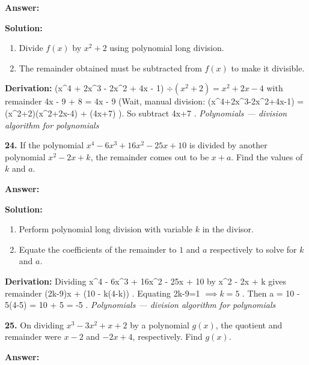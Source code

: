 \documentclass[12pt,a4paper]{exam}
\newcommand{\fitmath}[1]{%
  \sbox{\schmathbox}{$\displaystyle #1$}%
  \ifdim\wd\schmathbox>\linewidth
    \resizebox{\linewidth}{!}{\usebox{\schmathbox}}%
  \else
    \usebox{\schmathbox}%
  \fi}
\begin{document}
\begin{questions}
\textbf{Answer:}
\begin{center}
\fitmath{\text{Subtract} 4x - 9}
\end{center}

\textbf{Solution:}
\begin{enumerate}
  \item Divide $f(x)$ by $x^2 + 2$ using polynomial long division.
  \item The remainder obtained must be subtracted from $f(x)$ to make it divisible.
\end{enumerate}
\textbf{Derivation:}
 (x\textasciicircum{}4 + 2x\textasciicircum{}3 - 2x\textasciicircum{}2 + 4x - 1) $\div (x^2 + 2) = x^2 + 2x - 4$  with remainder  4x - 9 + 8 = 4x - 9  (Wait, manual division:  (x\textasciicircum{}4+2x\textasciicircum{}3-2x\textasciicircum{}2+4x-1) = (x\textasciicircum{}2+2)(x\textasciicircum{}2+2x-4) + (4x+7) ). So subtract  4x+7 .
\hfill \textit{Polynomials — division algorithm for polynomials}
\vspace{0.3cm}

\question \textbf{24.} If the polynomial $x^4 - 6x^3 + 16x^2 - 25x + 10$ is divided by another polynomial $x^2 - 2x + k$, the remainder comes out to be $x + a$. Find the values of $k$ and $a$.

\textbf{Answer:}
\begin{center}
\fitmath{k=5, a=-5}
\end{center}

\textbf{Solution:}
\begin{enumerate}
  \item Perform polynomial long division with variable $k$ in the divisor.
  \item Equate the coefficients of the remainder to $1$ and $a$ respectively to solve for $k$ and $a$.
\end{enumerate}
\textbf{Derivation:}
Dividing  x\textasciicircum{}4 - 6x\textasciicircum{}3 + 16x\textasciicircum{}2 - 25x + 10  by  x\textasciicircum{}2 - 2x + k  gives remainder  (2k-9)x + (10 - k(4-k)) . Equating  2k-9=1 $\implies k=5$ . Then  a = 10 - 5(4-5) = 10 + 5 = -5 .
\hfill \textit{Polynomials — division algorithm for polynomials}
\vspace{0.3cm}

\question \textbf{25.} On dividing $x^3 - 3x^2 + x + 2$ by a polynomial $g(x)$, the quotient and remainder were $x - 2$ and $-2x + 4$, respectively. Find $g(x)$.

\textbf{Answer:}
\begin{center}
\fitmath{g(x) = x^2 - x + 1}
\end{center}


\end{questions}
\end{document}
